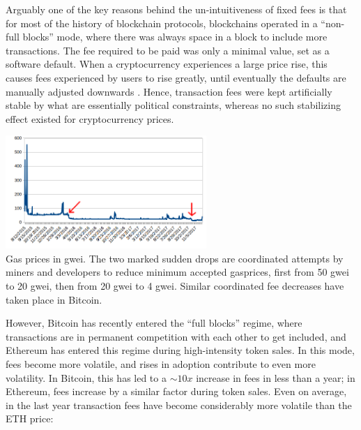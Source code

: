 \documentclass[12pt, final]{article}
\begin{document}
Arguably one of the key reasons behind the un-intuitiveness of fixed fees is that for most of the history of blockchain protocols, blockchains operated in a ``non-full blocks'' mode, where there was always space in a block to include more transactions. The fee required to be paid was only a minimal value, set as a software default. When a cryptocurrency experiences a large price rise, this causes fees experienced by users to rise greatly, until eventually the defaults are manually adjusted downwards \cite{coindesk-btc-txn-fee, reddit-rec-miners, vitalik-twitter1}.  Hence, transaction fees were kept artificially stable by what are essentially political constraints, whereas no such stabilizing effect existed for cryptocurrency prices.

\begin{center}
\includegraphics[width=3in]{GaspriceInGwei.png} \\
\scriptsize{Gas prices in gwei. The two marked sudden drops are coordinated attempts by miners and developers to reduce minimum accepted gasprices, first from 50 gwei to 20 gwei, then from 20 gwei to 4 gwei. Similar coordinated fee decreases have taken place in Bitcoin\cite{btcfeesdown10x}.}
\end{center}

However, Bitcoin has recently entered the ``full blocks'' regime, where transactions are in permanent competition with each other to get included, and Ethereum has entered this regime during high-intensity token sales\cite{braveICO}. In this mode, fees become more volatile, and rises in adoption contribute to even more volatility. In Bitcoin, this has led to a $\sim 10x$ increase in fees in less than a year; in Ethereum, fees increase by a similar factor during token sales. Even on average, in the last year transaction fees have become considerably more volatile than the ETH price:
\end{document}

